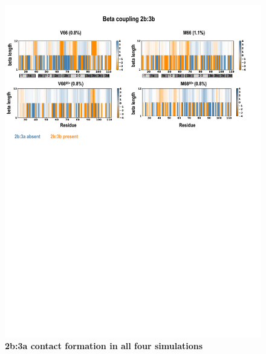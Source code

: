 \documentclass[journal=jacsat,manuscript=article]{achemso}
\begin{document}
\begin{figure}[!ht]
\includegraphics[scale=0.5,width=12cm,trim={0 0cm 0 0cm},clip]{../figures/coupling_5.pdf}
\caption{{\bf 2b:3a contact formation in all four simulations}
 }
\label{fig6}
\end{figure}
\end{document}
